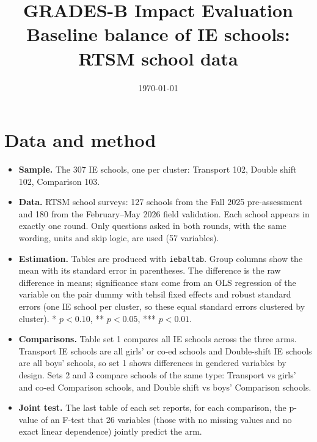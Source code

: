 \documentclass[11pt,a4paper]{article}
\title{GRADES-B Impact Evaluation\\[6pt]
       \large Baseline balance of IE schools: RTSM school data}
\author{}
\date{\today}
\begin{document}
\maketitle

\section*{Data and method}
\begin{itemize}
  \item \textbf{Sample.} The 307 IE schools, one per cluster: Transport 102,
        Double shift 102, Comparison 103.
  \item \textbf{Data.} RTSM school surveys: 127 schools from the Fall 2025
        pre-assessment and 180 from the February--May 2026 field validation.
        Each school appears in exactly one round. Only questions asked in both
        rounds, with the same wording, units and skip logic, are used
        (57 variables).
  \item \textbf{Estimation.} Tables are produced with \texttt{iebaltab}. Group
        columns show the mean with its standard error in parentheses. The
        difference is the raw difference in means; significance stars come from
        an OLS regression of the variable on the pair dummy with tehsil fixed
        effects and robust standard errors (one IE school per cluster, so these
        equal standard errors clustered by cluster).
        * $p<0.10$, ** $p<0.05$, *** $p<0.01$.
  \item \textbf{Comparisons.} Table set 1 compares all IE schools across the
        three arms. Transport IE schools are all girls' or co-ed schools and
        Double-shift IE schools are all boys' schools, so set 1 shows
        differences in gendered variables by design. Sets 2 and 3 compare
        schools of the same type: Transport vs girls' and co-ed Comparison
        schools, and Double shift vs boys' Comparison schools.
  \item \textbf{Joint test.} The last table of each set reports, for each
        comparison, the p-value of an F-test that 26 variables (those with no
        missing values and no exact linear dependence) jointly predict the arm.
\end{itemize}

\listoftables
\end{document}
